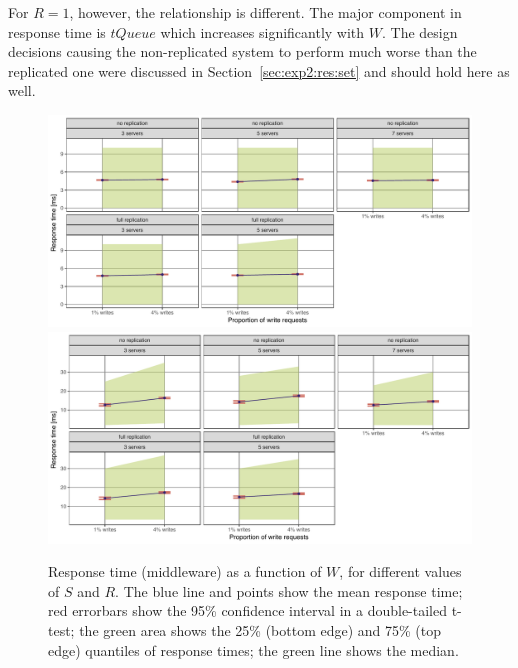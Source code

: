 \documentclass[11pt]{article}
\begin{document}
For $R=1$, however, the relationship is different. The major component in response time is $tQueue$ which increases significantly with $W$. The design decisions causing the non-replicated system to perform much worse than the replicated one were discussed in Section~\ref{sec:exp2:res:set} and should hold here as well.

\begin{figure}[p]
\centering
\includegraphics[width=\textwidth]{../results/writes/graphs/response_time_vs_writes_get.pdf}
\includegraphics[width=\textwidth]{../results/writes/graphs/response_time_vs_writes_set.pdf}
\caption{Response time (middleware) as a function of $W$, for different values of $S$ and $R$. The blue line and points show the mean response time; red errorbars show the 95\% confidence interval in a double-tailed t-test; the green area shows the 25\% (bottom edge) and 75\% (top edge) quantiles of response times; the green line shows the median.}
\label{fig:exp3:res:responsetime}
\end{figure}
\end{document}
